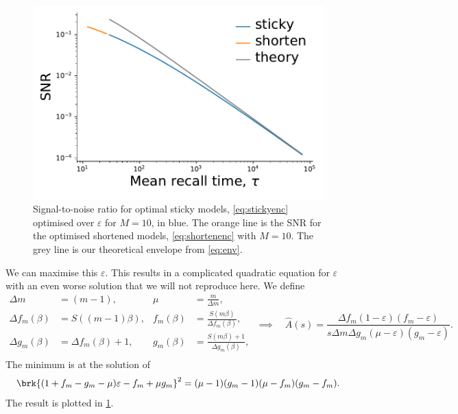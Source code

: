 \documentclass[12pt]{article}
\begin{document}
\begin{figure}[ht]
\begin{center}
  \includegraphics[width=0.4\linewidth]{sticky_opt.pdf}
\caption[Signal-to-noise ratio for optimal sticky models]
{Signal-to-noise ratio for optimal sticky models, \cref{eq:stickyenc} optimised over \(\varepsilon\) for \(M=10\), in blue.
  The orange line is the SNR for the optimised shortened models, \cref{eq:shortenenc} with \(M=10\).
  The grey line is our theoretical envelope from \cref{eq:env}.
  \label{fig:sticky}}
\end{center}
\end{figure}

We can maximise this \wrt $\varepsilon$.
This results in a complicated quadratic equation for $\varepsilon$ with an even worse solution that we will not reproduce here.
We define
%
\begin{equation*}
\begin{aligned}
  \Delta m &= (m-1), &
  \mu &= \frac{m}{\Delta m}, \\
  \Delta f_m(\beta) &= S((m-1)\beta), &
  f_m(\beta) &= \frac{S(m\beta)}{\Delta f_m(\beta)}, \\
  \Delta g_m(\beta) &= \Delta f_m(\beta) + 1 , &
  g_m(\beta) &= \frac{S(m\beta) + 1}{\Delta g_m(\beta)}, \\
\end{aligned}
 \; \implies \quad
 \hat{A}(s) = \frac{\Delta f_m (1 - \varepsilon) (f_m - \varepsilon)}
                    {s \Delta m \Delta g_m (\mu - \varepsilon) (g_m - \varepsilon)}.
\end{equation*}
%
The minimum is at the solution of
%
\begin{equation*}
  \brk{(1 + f_m -  g_m - \mu)\varepsilon - f_m + \mu g_m}^2 
    = (\mu - 1) (g_m - 1) (\mu - f_m) (g_m - f_m).
\end{equation*}
%
The result is plotted in \cref{fig:sticky}.
\end{document}
